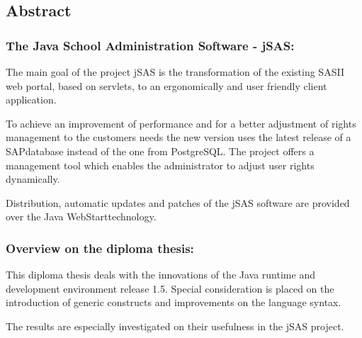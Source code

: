 \begin{flushleft}
	
	\subsection*{Abstract}
	

	\subsubsection*{The Java School Administration Software - jSAS:}
	
	The main goal of the project jSAS is the transformation of the existing SASII web portal, based on servlets, to an ergonomically and user friendly client application.
	
	To achieve an improvement of performance and for a better adjustment of rights management to the customers needs the new version uses the latest release of a SAP\tm database instead of the one from PostgreSQL\tm.
	The project offers a management tool which enables the administrator to adjust user rights dynamically.
	
	Distribution, automatic updates and patches of the jSAS software are provided over the Java WebStart\tm technology.
	
	\subsubsection*{Overview on the diploma thesis:}
	
	This diploma thesis deals with the innovations of the Java runtime and development environment release 1.5. Special consideration is placed on the introduction of generic constructs and improvements on the language syntax.
	
	The results are especially investigated on their usefulness in the jSAS project.
\end{flushleft}